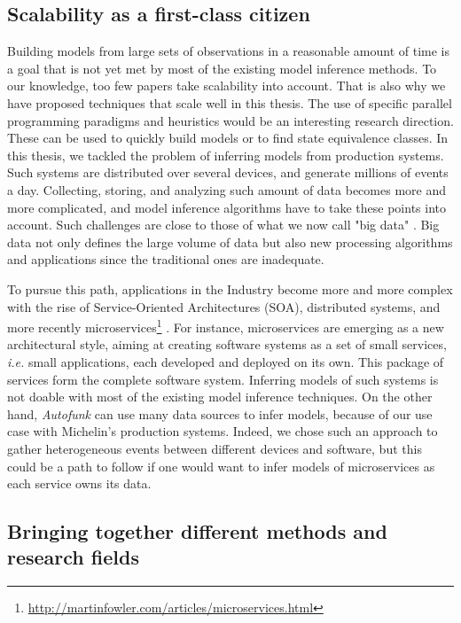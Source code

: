 \subsection{Scalability as a first-class citizen}

Building models from large sets of observations in a reasonable
amount of time is a goal that is not yet met by most of the
existing model inference methods. To our knowledge, too few
papers \cite{Yang:2006:PMT:1134285.1134325,Pradel:2009} take
scalability into account. That is also why we have proposed
techniques that scale well in this thesis. The use of specific
parallel programming paradigms and heuristics would be an
interesting research direction. These can be used to quickly
build models or to find state equivalence classes. In this
thesis, we tackled the problem of inferring models from
production systems. Such systems are distributed over several
devices, and generate millions of events a day. Collecting,
storing, and analyzing such amount of data becomes more and more
complicated, and model inference algorithms have to take these
points into account. Such challenges are close to those of what
we now call "big data" \cite{bigdata14}. Big data not only
defines the large volume of data but also new processing
algorithms and applications since the traditional ones are
inadequate.

To pursue this path, applications in the Industry become more and
more complex with the rise of Service-Oriented Architectures
(SOA), distributed systems, and more recently
microservices\footnote{\url{http://martinfowler.com/articles/microservices.html}}
\cite{thones2015microservices}.  For instance, microservices are
emerging as a new architectural style, aiming at creating
software systems as a set of small services, \emph{i.e.} small
applications, each developed and deployed on its own. This
package of services form the complete software system. Inferring
models of such systems is not doable with most of the existing
model inference techniques. On the other hand, \textit{Autofunk}
can use many data sources to infer models, because of our use
case with Michelin's production systems. Indeed, we chose such an
approach to gather heterogeneous events between different devices
and software, but this could be a path to follow if one would
want to infer models of microservices as each service owns its
data.

\subsection{Bringing together different methods and research
fields}

